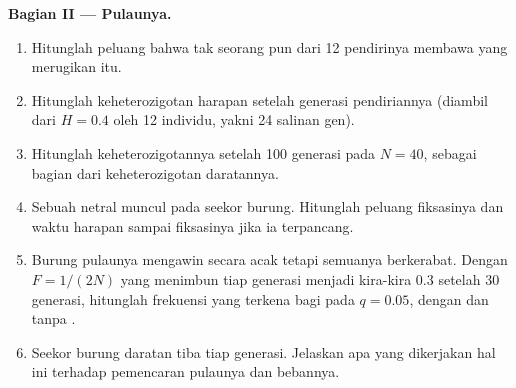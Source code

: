 \begin{problem}
\medskip
\noindent\textbf{Bagian II --- Pulaunya.}
\begin{enumerate}[resume]
  \item Hitunglah peluang bahwa tak seorang pun dari 12 pendirinya
        membawa  yang merugikan itu.
  \item Hitunglah keheterozigotan harapan setelah generasi
        pendiriannya (diambil dari $H = 0.4$ oleh 12 individu, yakni 24
        salinan gen).
  \item Hitunglah keheterozigotannya setelah 100 generasi pada $N =
        40$, sebagai bagian dari keheterozigotan daratannya.
  \item Sebuah  netral muncul pada seekor burung. Hitunglah
        peluang fiksasinya dan waktu harapan sampai fiksasinya jika ia
        terpancang.
  \item Burung pulaunya mengawin secara acak tetapi semuanya
        berkerabat. Dengan $F = 1/(2N)$ yang menimbun tiap generasi
        menjadi kira-kira $0.3$ setelah 30 generasi, hitunglah
        frekuensi  yang terkena bagi  pada $q = 0.05$,
        dengan dan tanpa .
  \item Seekor burung daratan tiba tiap generasi. Jelaskan apa yang
        dikerjakan hal ini terhadap pemencaran pulaunya dan bebannya.
\end{enumerate}


\end{problem}
